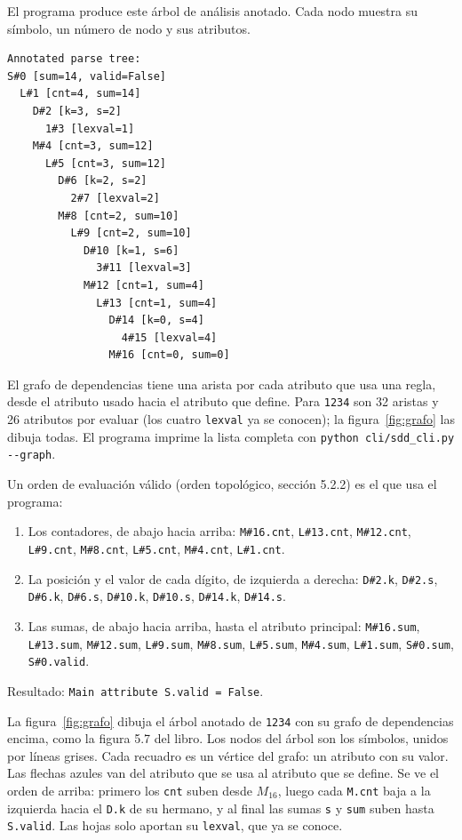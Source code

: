 \documentclass[11pt,a4paper]{article}
\begin{document}
El programa produce este árbol de análisis anotado. Cada nodo muestra su símbolo, un número de nodo y sus atributos.
\begin{small}
\begin{verbatim}
Annotated parse tree:
S#0 [sum=14, valid=False]
  L#1 [cnt=4, sum=14]
    D#2 [k=3, s=2]
      1#3 [lexval=1]
    M#4 [cnt=3, sum=12]
      L#5 [cnt=3, sum=12]
        D#6 [k=2, s=2]
          2#7 [lexval=2]
        M#8 [cnt=2, sum=10]
          L#9 [cnt=2, sum=10]
            D#10 [k=1, s=6]
              3#11 [lexval=3]
            M#12 [cnt=1, sum=4]
              L#13 [cnt=1, sum=4]
                D#14 [k=0, s=4]
                  4#15 [lexval=4]
                M#16 [cnt=0, sum=0]
\end{verbatim}
\end{small}

El grafo de dependencias tiene una arista por cada atributo que usa una regla, desde el atributo usado hacia el atributo que define. Para \texttt{1234} son 32 aristas y 26 atributos por evaluar (los cuatro \texttt{lexval} ya se conocen); la figura~\ref{fig:grafo} las dibuja todas. El programa imprime la lista completa con \texttt{python cli/sdd\_cli.py -{}-graph}.

Un orden de evaluación válido (orden topológico, sección 5.2.2) es el que usa el programa:

\begin{enumerate}
\item Los contadores, de abajo hacia arriba: \texttt{M\#16.cnt}, \texttt{L\#13.cnt}, \texttt{M\#12.cnt}, \texttt{L\#9.cnt}, \texttt{M\#8.cnt}, \texttt{L\#5.cnt}, \texttt{M\#4.cnt}, \texttt{L\#1.cnt}.
\item La posición y el valor de cada dígito, de izquierda a derecha: \texttt{D\#2.k}, \texttt{D\#2.s}, \texttt{D\#6.k}, \texttt{D\#6.s}, \texttt{D\#10.k}, \texttt{D\#10.s}, \texttt{D\#14.k}, \texttt{D\#14.s}.
\item Las sumas, de abajo hacia arriba, hasta el atributo principal: \texttt{M\#16.sum}, \texttt{L\#13.sum}, \texttt{M\#12.sum}, \texttt{L\#9.sum}, \texttt{M\#8.sum}, \texttt{L\#5.sum}, \texttt{M\#4.sum}, \texttt{L\#1.sum}, \texttt{S\#0.sum}, \texttt{S\#0.valid}.
\end{enumerate}

\medskip
Resultado: \texttt{Main attribute S.valid = False}.

La figura~\ref{fig:grafo} dibuja el árbol anotado de \texttt{1234} con su grafo de dependencias encima, como la figura 5.7 del libro. Los nodos del árbol son los símbolos, unidos por líneas grises. Cada recuadro es un vértice del grafo: un atributo con su valor. Las flechas azules van del atributo que se usa al atributo que se define. Se ve el orden de arriba: primero los \texttt{cnt} suben desde $M_{16}$, luego cada \texttt{M.cnt} baja a la izquierda hacia el \texttt{D.k} de su hermano, y al final las sumas \texttt{s} y \texttt{sum} suben hasta \texttt{S.valid}. Las hojas solo aportan su \texttt{lexval}, que ya se conoce.
\end{document}

